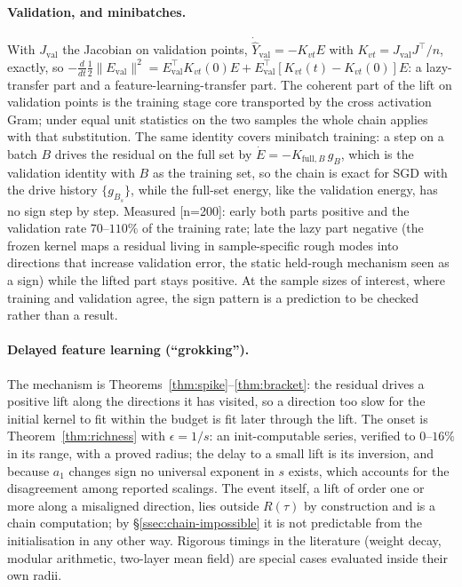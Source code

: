 \paragraph{Validation, and minibatches.} With $J_{\mathrm{val}}$ the Jacobian on validation
points, $\dot{\hat Y}_{\mathrm{val}}=-K_{vt}E$ with
$K_{vt}=J_{\mathrm{val}}J^{\!\top}/n$, exactly, so
$-\frac d{dt}\frac12\|E_{\mathrm{val}}\|^2=E_{\mathrm{val}}^{\!\top}K_{vt}(0)E+
E_{\mathrm{val}}^{\!\top}[K_{vt}(t)-K_{vt}(0)]E$: a lazy-transfer part and a
feature-learning-transfer part. The coherent part of the lift on validation
points is the training stage core transported by the cross activation Gram;
under equal unit statistics on the two samples the whole chain applies with
that substitution. The same identity covers minibatch training: a step on a
batch $B$ drives the residual on the full set by $\dot E=-K_{\mathrm{full},B}\,g_B$,
which is the validation identity with $B$ as the training set, so the chain
is exact for SGD with the drive history $\{g_{B_s}\}$, while the full-set
energy, like the validation energy, has no sign step by step.
Measured [n=200]: early both parts positive and the
validation rate $70$--$110\%$ of the training rate; late the lazy part
negative (the frozen kernel maps a residual living in sample-specific rough
modes into directions that increase validation error, the static held-rough
mechanism seen as a sign) while the lifted part stays positive. At the sample
sizes of interest, where training and validation agree, the sign pattern is a
prediction to be checked rather than a result.

\paragraph{Delayed feature learning (``grokking'').} The mechanism is
Theorems~\ref{thm:spike}--\ref{thm:bracket}: the residual drives a positive
lift along the directions it has visited, so a direction too slow for the
initial kernel to fit within the budget is fit later through the lift. The
onset is Theorem~\ref{thm:richness} with $\epsilon=1/s$: an init-computable
series, verified to $0$--$16\%$ in its range, with a proved radius; the delay
to a small lift is its inversion, and because $a_1$ changes sign no universal
exponent in $s$ exists, which accounts for the disagreement among reported
scalings. The event itself, a lift of order one or more along a misaligned
direction, lies outside $R(\tau)$ by construction and is a chain computation;
by \S\ref{ssec:chain-impossible} it is not predictable from the
initialisation in any other way. Rigorous timings in the literature (weight
decay, modular arithmetic, two-layer mean field) are special cases evaluated
inside their own radii.

